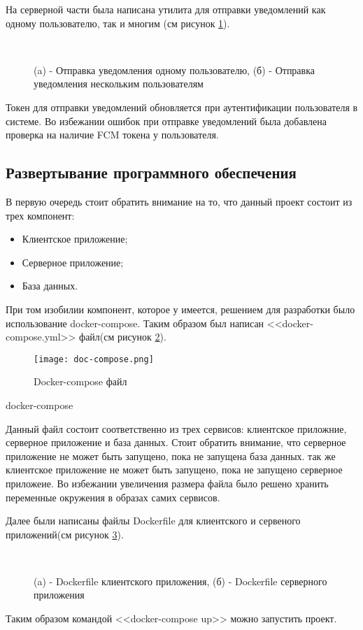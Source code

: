 На серверной части была написана утилита для отправки уведомлений как одному пользователю, так и многим (см рисунок \ref{server:sendpush}).

\begin{figure}[h]
    \centering
     \\
    \caption{ (a) - Отправка уведомления одному пользователю, (б) - Отправка уведомления нескольким пользователям }
    \label{server:sendpush}
\end{figure}

Токен для отправки уведомлений обновляется при аутентификации пользователя в системе.
Во избежании ошибок при отправке уведомлений была добавлена проверка на наличие FCM токена у пользователя.

\subsection{Развертывание программного обеспечения}
В первую очередь стоит обратить внимание на то, что данный проект состоит из трех компонент:
\begin{itemize}
    \item Клиентское приложение;
    \item Серверное приложение;
    \item База данных.
\end{itemize}

При том изобилии компонент, которое у имеется, решением для разработки было использование docker-compose.
Таким образом был написан <<docker-compose.yml>> файл(см рисунок \ref{composefile}).

\begin{figure}[h!]
    \centering
    \texttt{[image: doc-compose.png]}
    \caption{ Docker-compose файл }
    \label{composefile}
\end{figure}
docker-compose

Данный файл состоит соответственно из трех сервисов: клиентское приложние, серверное приложение и база данных.
Стоит обратить внимание, что серверное приложение не может быть запущено, пока не запущена база данных.
так же клиентское приложение не может быть запущено, пока не запущено серверное приложеие.
Во избежании увеличения размера файла было решено хранить переменные окружения в образах самих сервисов.

Далее были написаны файлы Dockerfile для клиентского и сервеного приложений(см рисунок \ref{dockerfiles}).

\begin{figure}[h]
    \centering
     \\
    \caption{ (a) - Dockerfile клиентского приложения, (б) - Dockerfile серверного приложения }
    \label{dockerfiles}
\end{figure}

Таким образом командой <<docker-compose up>> можно запустить проект.
